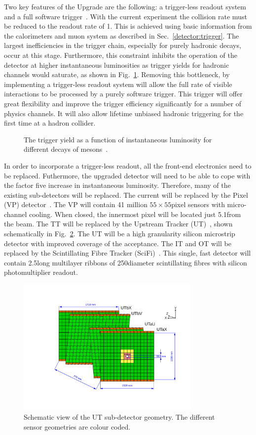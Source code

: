 Two key features of the \lhcb Upgrade are the following: a trigger-less readout system and a full software trigger~\cite{LHCb-TDR-016}. With the current experiment the collision rate must be reduced to the readout rate of 1\mhz. This is achieved using basic information from the calorimeters and muon system as described in Sec.~\ref{detector:trigger}. The largest inefficiencies in the trigger chain, especially for purely hadronic decays, occur at this stage. Furthermore, this constraint inhibits the operation of the detector at higher instantaneous luminosities as trigger yields for hadronic channels would saturate, as shown in Fig.~\ref{fig:upgrade-motivation}. Removing this bottleneck, by implementing a trigger-less readout system will allow the full rate of visible interactions to be processed by a purely software trigger. This trigger will offer great flexibility and improve the trigger efficiency significantly for a number of physics channels. It will also allow lifetime unbiased hadronic triggering for the first time at a hadron collider.

\begin{figure}[!tb]
\centering
{}
\caption{The trigger yield as a function of instantaneous luminosity for different decays of \B mesons~\cite{upgrade-loi}.}
\label{fig:upgrade-motivation}
\end{figure}

In order to incorporate a trigger-less readout, all the front-end electronics need to be replaced. Futhermore, the upgraded detector will need to be able to cope with the factor five increase in instantaneous luminosity. Therefore, many of the existing sub-detectors will be replaced. The current \velo will be replaced by the \velo Pixel (VP) detector~\cite{LHCb-TDR-013}. The VP will contain 41 million $55\times55$\mum pixel sensors with micro-channel \cotwo cooling. When closed, the innermost pixel will be located just 5.1\mm from the \lhcb beam. The TT will be replaced by the Upstream Tracker (UT)~\cite{LHCb-TDR-015}, shown schematically in Fig.~\ref{fig:ut}. The UT will be a high granularity silicon microstrip detector with improved coverage of the \lhcb acceptance. The IT and OT will be replaced by the Scintillating Fibre Tracker (SciFi)~\cite{LHCb-TDR-015}. This single, fast detector will contain 2.5\m long multilayer ribbons of 250\mum diameter scintillating fibres with silicon photomultiplier readout.

\begin{figure}[!tb]
\centering
\includegraphics[width=0.8\textwidth]{figs/detector/ut.pdf}
\caption{Schematic view of the UT sub-detector geometry. The different sensor geometries are colour coded.}
\label{fig:ut}
\end{figure}
